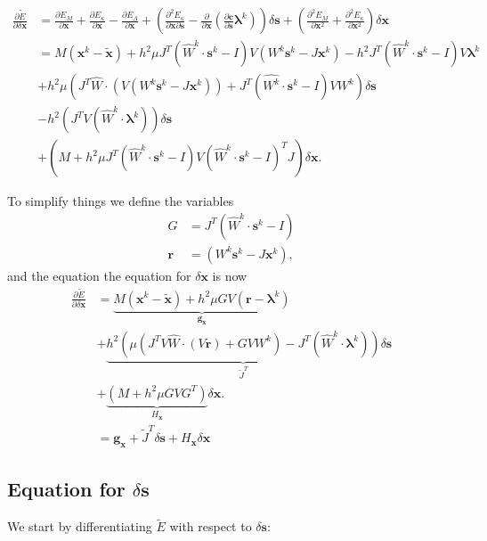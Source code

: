 \documentclass[letterpaper,12pt]{article}
\theoremstyle{remark}
\newcommand{\Th}{\mathcal{T}}
\newcommand{\x}{\mathbf{x}}
\newcommand{\C}{\mathbf{c}}
\newcommand{\s}{\mathbf{s}}
\newcommand{\la}{\mathbf{\lambda}}
\newcommand{\dx}{\delta \x}
\newcommand{\ds}{\delta \s}
\newcommand{\El}{E_\Lambda}
\newcommand{\Hx}{ {H_\x} }
\newcommand{\gx}{ {\mathbf{g}_\x} }
\newcommand{\res}{ {\mathbf{r}} }
\newcommand{\Jt}{ {\tilde{J}} }
\begin{document}
\begin{equation}
\begin{split}
\frac{\partial \tilde{E}}{\partial \dx} &=
 \frac{\partial E_M}{\partial \x} + \frac{\partial E_\kappa}{\partial \x} -  \frac{\partial \El}{\partial \x} 
 + \left( \frac{\partial^2 E_\kappa}{\partial \x \partial \s}
 - \frac{\partial}{\partial \x} \left(\frac{\partial \C}{\partial \s} \la^k\right) \right)\ds
 + \left(\frac{\partial^2 E_M}{\partial \x^2} 
+ \frac{\partial^2 E_\kappa}{\partial \x^2} \right) \dx \\
&= M(\x^k - \tilde{\x}) +  h^2 \mu J^T(\hat{W}^k\cdot\s^k - I) V (W^k\s^k - J\x^k) 
	-  h^2 J^T(\hat{W}^k\cdot\s^k - I)V\la^k \\
&+  h^2 \mu \left( 
	J^T \hat{W} \cdot \left(V (W^k\s^k - J\x^k)	\right)
  + J^T(\hat{W^k}\cdot\s^k - I)  V W^k
   \right) \ds \\
&-  h^2 \left(J^T V(\hat{W}^k\cdot \la^k) \right) \ds \\
&+ \left( M +  h^2 \mu J^T(\hat{W}^k\cdot\s^k - I) V (\hat{W}^k\cdot\s^k - I)^T J \right) \dx.
\end{split}
\end{equation}

To simplify things we define the variables
\begin{align}
G &= J^T(\hat{W}^k\cdot\s^k - I)  \\
\res &= (W^k\s^k - J\x^k),
\end{align}
and the equation the equation for $\dx$ is now
\begin{equation}
\begin{split}
\frac{\partial \tilde{E}}{\partial \dx} 
&= \underbrace{M(\x^k - \tilde{\x}) +  h^2 \mu G V (\res - \la^k)}_\gx \\
&+ \underbrace{ h^2 \left( \mu \left(
	J^T V \hat{W} \cdot \left(V \res	\right)
  + G V W^k \right)
   - J^T(\hat{W}^k\cdot \la^k) \right)}_{\Jt^T} \ds \\
&+ \underbrace{\left( M +  h^2 \mu G V G^T \right)}_\Hx \dx.\\
&= \gx + \Jt^T \ds + \Hx \dx
\end{split}
\end{equation}

\subsection{Equation for $\ds$}
We start by differentiating $\tilde{E}$ with respect to $\ds$:
\end{document}
